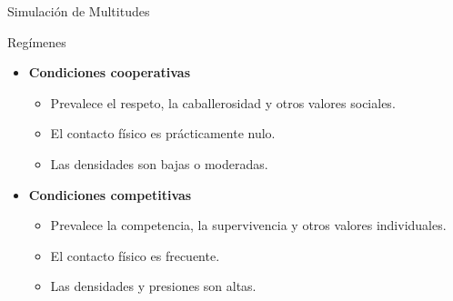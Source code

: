 \begin{frame}{Simulación de Multitudes}
    \begin{block}{Regímenes}
        \begin{itemize}
            \item \textbf{Condiciones cooperativas}
            \begin{itemize}
                \item Prevalece el respeto, la caballerosidad y otros valores sociales.
                \item El contacto físico es prácticamente nulo.
                \item Las densidades son bajas o moderadas.
            \end{itemize}
            \item \textbf{Condiciones competitivas}
            \begin{itemize}
                \item Prevalece la competencia, la supervivencia y otros valores individuales.
                \item El contacto físico es frecuente.
                \item Las densidades y presiones son altas.
            \end{itemize}
        \end{itemize}
    \end{block}
\end{frame}

